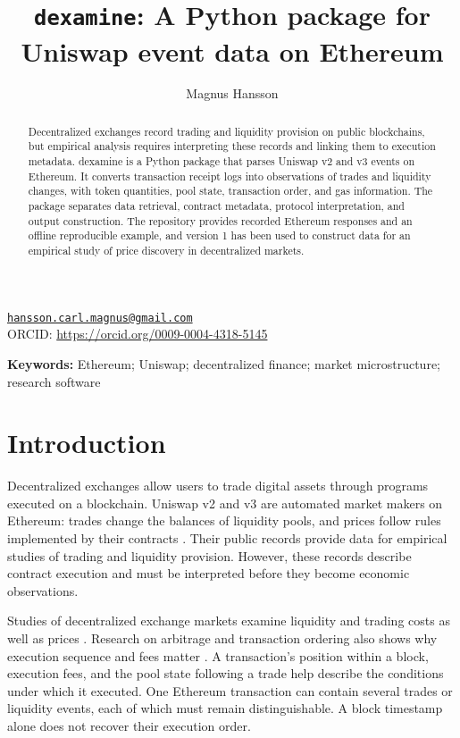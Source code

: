 \documentclass[11pt]{article}
\title{\texttt{dexamine}: A Python package for Uniswap event data on Ethereum}
\author[1,2]{Magnus Hansson}
\affil[1]{Stockholm University}
\affil[2]{Swedish House of Finance}
\date{}
\begin{document}
\maketitle
\vspace{-2em}
\begin{center}
\small
\href{mailto:hansson.carl.magnus@gmail.com}{\nolinkurl{hansson.carl.magnus@gmail.com}}\\
ORCID: \url{https://orcid.org/0009-0004-4318-5145}\\
\end{center}

\begin{abstract}
\noindent
Decentralized exchanges record trading and liquidity provision on public blockchains,
but empirical analysis requires interpreting these records and linking them to
execution metadata. dexamine is a Python package that parses Uniswap v2 and v3 events
on Ethereum. It converts transaction receipt logs into observations of trades and
liquidity changes, with token quantities, pool state, transaction order, and gas
information. The package separates data retrieval, contract metadata, protocol
interpretation, and output construction. The repository provides recorded Ethereum
responses and an offline reproducible example, and version 1 has been used to
construct data for an empirical study of price discovery in decentralized markets.
\end{abstract}

\noindent\textbf{Keywords:} Ethereum; Uniswap; decentralized finance; market
microstructure; research software

\section{Introduction}
Decentralized exchanges allow users to trade digital assets through programs executed
on a blockchain. Uniswap v2 and v3 are automated market makers on Ethereum: trades
change the balances of liquidity pools, and prices follow rules implemented by their
contracts \cite{adams2020,adams2021}. Their public records provide data for empirical
studies of trading and liquidity provision. However, these records describe contract
execution and must be interpreted before they become economic observations.

Studies of decentralized exchange markets examine liquidity and trading costs
as well as prices \cite{lehar2025,barbon2026}. Research on arbitrage and transaction
ordering also shows why execution sequence and fees matter \cite{daian2020}.
A transaction's position within a block, execution fees, and the pool state following
a trade help describe the conditions under which it executed. One Ethereum transaction can
contain several trades or liquidity
events, each of which must remain distinguishable. A block timestamp alone does not
recover their execution order.
\end{document}
